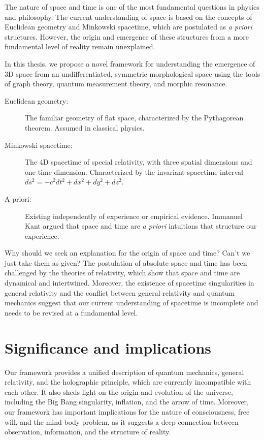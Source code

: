 The nature of space and time is one of the most fundamental questions in physics and philosophy. The current understanding of space is based on the concepts of Euclidean geometry and Minkowski spacetime, which are postulated as \textit{a priori} structures. However, the origin and emergence of these structures from a more fundamental level of reality remain unexplained. 

In this thesis, we propose a novel framework for understanding the emergence of 3D space from an undifferentiated, symmetric morphological space using the tools of graph theory, quantum measurement theory, and morphic resonance.

\begin{tcolorbox}[colback=blue!5!white,colframe=blue!75!black,title=New terms]
\begin{description}
\item[Euclidean geometry:] The familiar geometry of flat space, characterized by the Pythagorean theorem. Assumed in classical physics.
\item[Minkowski spacetime:] The 4D spacetime of special relativity, with three spatial dimensions and one time dimension. Characterized by the invariant spacetime interval $ds^2 = -c^2 dt^2 + dx^2 + dy^2 + dz^2$.
\item[A priori:] Existing independently of experience or empirical evidence. Immanuel Kant argued that space and time are \textit{a priori} intuitions that structure our experience.
\end{description}
\end{tcolorbox}

\begin{tcolorbox}[colback=green!5!white,colframe=green!75!black,title=Question]
Why should we seek an explanation for the origin of space and time? Can't we just take them as given?
\tcblower
The postulation of absolute space and time has been challenged by the theories of relativity, which show that space and time are dynamical and intertwined. Moreover, the existence of spacetime singularities in general relativity and the conflict between general relativity and quantum mechanics suggest that our current understanding of spacetime is incomplete and needs to be revised at a fundamental level.
\end{tcolorbox}

\section{Significance and implications}
Our framework provides a unified description of quantum mechanics, general relativity, and the holographic principle, which are currently incompatible with each other. It also sheds light on the origin and evolution of the universe, including the Big Bang singularity, inflation, and the arrow of time. Moreover, our framework has important implications for the nature of consciousness, free will, and the mind-body problem, as it suggests a deep connection between observation, information, and the structure of reality.

